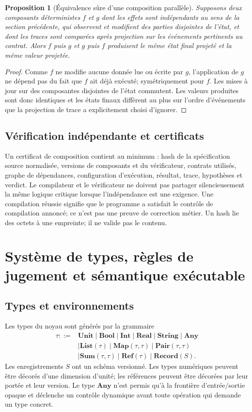\documentclass[11pt,a4paper]{article}
\theoremstyle{definition}
\theoremstyle{plain}
\newtheorem{proposition}[definition]{Proposition}
\theoremstyle{remark}
\begin{document}
\begin{proposition}[Équivalence sûre d'une composition parallèle]
Supposons deux composants déterministes $f$ et $g$ dont les effets sont indépendants au sens de la section précédente, qui observent et modifient des parties disjointes de l'état, et dont les traces sont comparées après projection sur les événements pertinents au contrat. Alors $f$ puis $g$ et $g$ puis $f$ produisent le même état final projeté et la même valeur projetée.
\end{proposition}
\begin{proof}
Comme $f$ ne modifie aucune donnée lue ou écrite par $g$, l'application de $g$ ne dépend pas du fait que $f$ ait déjà exécuté; symétriquement pour $f$. Les mises à jour sur des composantes disjointes de l'état commutent. Les valeurs produites sont donc identiques et les états finaux diffèrent au plus sur l'ordre d'événements que la projection de trace a explicitement choisi d'ignorer.
\end{proof}

\subsection{Vérification indépendante et certificats}
Un certificat de composition contient au minimum : hash de la spécification source normalisée, versions de composants et du vérificateur, contrats utilisés, graphe de dépendances, configuration d'exécution, résultat, trace, hypothèses et verdict. Le compilateur et le vérificateur ne doivent pas partager silencieusement la même logique critique lorsque l'indépendance est une exigence. Une compilation réussie signifie que le programme a satisfait le contrôle de compilation annoncé; ce n'est pas une preuve de correction métier. Un hash lie des octets à une empreinte; il ne valide pas le contenu.


\section{Système de types, règles de jugement et sémantique exécutable}
\subsection{Types et environnements}
Les types du noyau sont générés par la grammaire
\begin{align*}
\tau ::= {}& \mathbf{Unit}\mid\mathbf{Bool}\mid\mathbf{Int}\mid\mathbf{Real}\mid\mathbf{String}\mid\mathbf{Any}\\
&\mid \mathbf{List}(\tau)\mid \mathbf{Map}(\tau,\tau)\mid \mathbf{Pair}(\tau,\tau)\\
&\mid \mathbf{Sum}(\tau,\tau)\mid \mathbf{Ref}(\tau)\mid \mathbf{Record}(S).
\end{align*}
Les enregistrements $S$ ont un schéma versionné. Les types numériques peuvent être décorés d'une dimension d'unité; les références peuvent être décorées par leur portée et leur version. Le type $\mathbf{Any}$ n'est permis qu'à la frontière d'entrée/sortie opaque et déclenche un contrôle dynamique avant toute opération qui demande un type concret.
\end{document}
